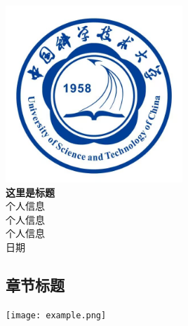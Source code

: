 \documentclass[12pt, oneside, a4paper]{article}
\begin{document}
\clearpage
\begin{titlepage}
    \centering
    \includegraphics[width=0.5\textwidth]{log.jpg}\\ %
    \vspace{2cm} 
    {\huge \bfseries 这里是标题}\\[1cm] 
    {\large 个人信息}\\[1cm] 
    {\large 个人信息}\\[1cm] 
    {\large 个人信息}\\[1cm] 
    {\large 日期} 
\end{titlepage}
\fontsize{14pt}{20pt}\selectfont
\pagestyle{empty} %
\begin{twocolumn}

\section{\textbf{章节标题}}
\begin{center}
  \texttt{[image: example.png]} %
\end{center}
\end{twocolumn}
\end{document}
